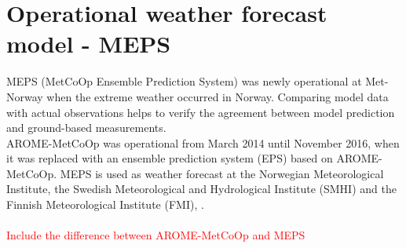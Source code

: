 \section{Operational weather forecast model - MEPS}\label{sec:DIM:MEPS}
MEPS (MetCoOp Ensemble Prediction System) was newly operational at Met-Norway when the extreme weather occurred in Norway. Comparing model data with actual observations helps to verify the agreement between model prediction and ground-based measurements. 
\\
AROME-MetCoOp was operational from March 2014 until November 2016, when it was replaced with an ensemble prediction system (EPS) based on AROME-MetCoOp.
MEPS is used as weather forecast at the Norwegian Meteorological Institute, the Swedish Meteorological and Hydrological Institute (SMHI) and the Finnish Meteorological Institute (FMI), \citep{muller_arome-metcoop:_2017, koltzow_metcoop_2017}.
\\
\\
\textcolor{red}{Include the difference between AROME-MetCoOp and MEPS \\
  } %

